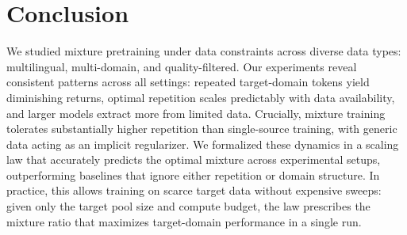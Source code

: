 \section{Conclusion}
\label{sec:conclusion}

We studied mixture pretraining under data constraints across diverse data types: multilingual, multi-domain, and quality-filtered.
Our experiments reveal consistent patterns across all settings: repeated target-domain tokens yield diminishing returns, optimal repetition scales predictably with data availability, and larger models extract more from limited data.
Crucially, mixture training tolerates substantially higher repetition than single-source training, with generic data acting as an implicit regularizer.
We formalized these dynamics in a scaling law that accurately predicts the optimal mixture across experimental setups, outperforming baselines that ignore either repetition or domain structure.
In practice, this allows training on scarce target data without expensive sweeps: given only the target pool size and compute budget, the law prescribes the mixture ratio that maximizes target-domain performance in a single run.


